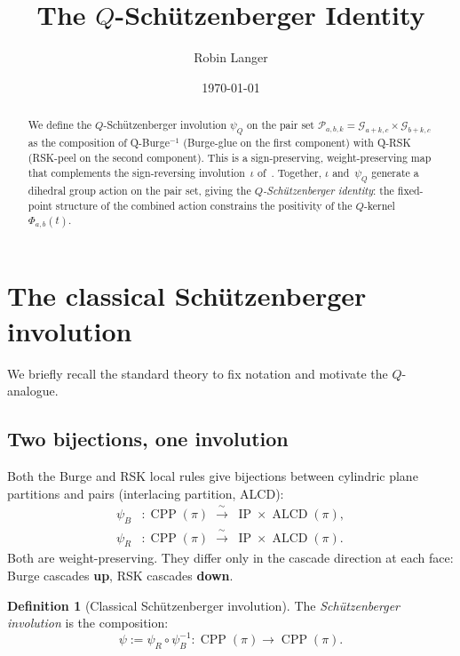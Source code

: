 \documentclass[11pt]{article}
\title{The $Q$-Sch\"utzenberger Identity}
\author{Robin Langer}
\date{\today}
\newcommand{\CPP}{\operatorname{CPP}}
\newcommand{\ALCD}{\operatorname{ALCD}}
\newcommand{\IP}{\operatorname{IP}}
\theoremstyle{plain}
\theoremstyle{definition}
\newtheorem{definition}[theorem]{Definition}
\begin{document}
\maketitle

\begin{abstract}
We define the $Q$-Sch\"utzenberger involution $\psi_Q$ on the
pair set $\mathcal{P}_{a,b,k} = \mathcal{G}_{a+k,c} \times
\mathcal{G}_{b+k,c}$ as the composition of Q-Burge$^{-1}$
(Burge-glue on the first component) with Q-RSK (RSK-peel on
the second component).  This is a sign-preserving,
weight-preserving map that complements the sign-reversing
involution~$\iota$ of~\cite{LOCAL_RULE}.  Together, $\iota$
and~$\psi_Q$ generate a dihedral group action on the pair set,
giving the \emph{$Q$-Sch\"utzenberger identity}: the
fixed-point structure of the combined action constrains the
positivity of the $Q$-kernel $\Phi_{a,b}(t)$.
\end{abstract}

\tableofcontents


\section{The classical Sch\"utzenberger involution}
\label{sec:classical}

We briefly recall the standard theory to fix notation and
motivate the $Q$-analogue.

\subsection{Two bijections, one involution}

Both the Burge and RSK local rules give bijections between
cylindric plane partitions and pairs (interlacing partition,
ALCD):
\begin{align}
  \psi_B &\colon \CPP(\pi) \;\xrightarrow{\;\sim\;}\;
    \IP \times \ALCD(\pi),
    \label{eq:psi-B} \\
  \psi_R &\colon \CPP(\pi) \;\xrightarrow{\;\sim\;}\;
    \IP \times \ALCD(\pi).
    \label{eq:psi-R}
\end{align}
Both are weight-preserving.  They differ only in the cascade
direction at each face: Burge cascades \textbf{up}, RSK
cascades \textbf{down}.

\begin{definition}[Classical Sch\"utzenberger involution]
\label{def:classical-schutz}
The \emph{Sch\"utzenberger involution} is the composition:
\begin{equation}\label{eq:psi-classical}
  \psi := \psi_R \circ \psi_B^{-1}
  \colon \CPP(\pi) \to \CPP(\pi).
\end{equation}
\end{definition}
\end{document}
